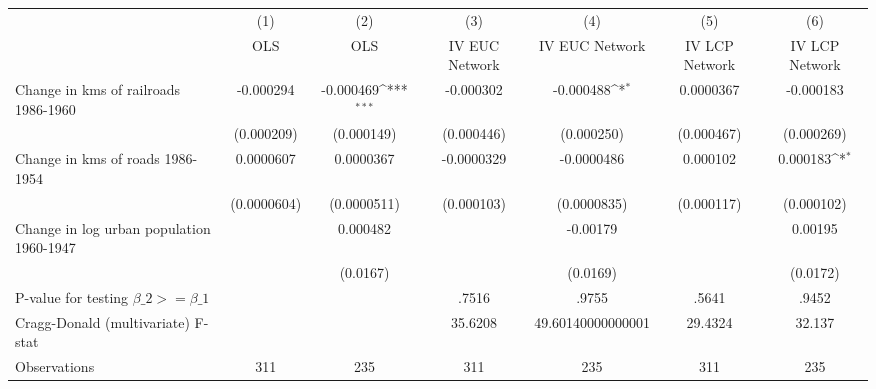 {
\def\sym#1{\ifmmode^{#1}\else\(^{#1}\)\fi}
\begin{tabular}{l*{6}{c}}
\hline\hline
                &\multicolumn{1}{c}{(1)}&\multicolumn{1}{c}{(2)}&\multicolumn{1}{c}{(3)}&\multicolumn{1}{c}{(4)}&\multicolumn{1}{c}{(5)}&\multicolumn{1}{c}{(6)}\\
                &\multicolumn{1}{c}{OLS}&\multicolumn{1}{c}{OLS}&\multicolumn{1}{c}{IV EUC Network}&\multicolumn{1}{c}{IV EUC Network}&\multicolumn{1}{c}{IV LCP Network}&\multicolumn{1}{c}{IV LCP Network}\\
\hline
Change in kms of railroads 1986-1960&-0.000294         &-0.000469\sym{***}&-0.000302         &-0.000488\sym{*}  &0.0000367         &-0.000183         \\
                &(0.000209)         &(0.000149)         &(0.000446)         &(0.000250)         &(0.000467)         &(0.000269)         \\
[1em]
Change in kms of roads 1986-1954&0.0000607         &0.0000367         &-0.0000329         &-0.0000486         & 0.000102         & 0.000183\sym{*}  \\
                &(0.0000604)         &(0.0000511)         &(0.000103)         &(0.0000835)         &(0.000117)         &(0.000102)         \\
[1em]
Change in log urban population 1960-1947&                  & 0.000482         &                  & -0.00179         &                  &  0.00195         \\
                &                  & (0.0167)         &                  & (0.0169)         &                  & (0.0172)         \\
\hline
P-value for testing $\beta\_{2} >= \beta\_{1}$&                  &                  &    .7516         &    .9755         &    .5641         &    .9452         \\
Cragg-Donald (multivariate) F-stat&                  &                  &  35.6208         &49.60140000000001         &  29.4324         &   32.137         \\
Observations    &      311         &      235         &      311         &      235         &      311         &      235         \\
\hline\hline
\end{tabular}
}
